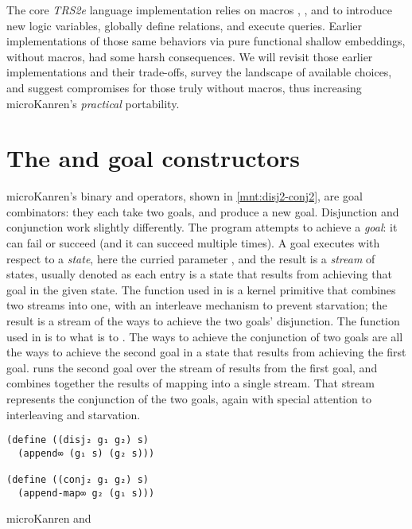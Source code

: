 \documentclass[sigplan,balance=true,pbalance=true,natbib=false]{acmart}
\begin{document}
The core \emph{TRS2e} language implementation relies on
macros , , and 
to introduce new logic variables, globally define relations, and
execute queries. Earlier implementations of those same behaviors via
pure functional shallow embeddings, without macros, had some harsh
consequences. We will revisit those earlier implementations and their
trade-offs, survey the landscape of available choices, and suggest
compromises for those truly without macros, thus increasing
microKanren's \emph{practical} portability.

\section{The  and  goal
  constructors}\label{sec:conde}

microKanren's binary  and 
operators, shown in \cref{mnt:disj2-conj2}, are goal combinators: they
each take two goals, and produce a new goal. Disjunction and
conjunction work slightly differently. The program attempts to achieve
a \emph{goal}: it can fail or succeed (and it can succeed multiple
times). A goal executes with respect to a \emph{state}, here the
curried parameter , and the result is a \emph{stream} of
states, usually denoted  as each entry is a state that
results from achieving that goal in the given state.
The
 function used in  is a kernel
primitive that combines two streams into one, with an interleave
mechanism to prevent starvation; the result is a stream of the ways to
achieve the two goals' disjunction. The 
function used in  is to
 what  is
to . The ways to achieve the conjunction of two
goals are all the ways to achieve the second goal in a state that
results from achieving the first goal.\@ {} runs
the second goal over the stream of results from the first goal, and
combines together the results of mapping into a single stream. That
stream represents the conjunction of the two goals, again with special
attention to interleaving and starvation.

\begin{listing}
  \begin{verbatim}
(define ((disj₂ g₁ g₂) s)
  (append∞ (g₁ s) (g₂ s)))

(define ((conj₂ g₁ g₂) s)
  (append-map∞ g₂ (g₁ s)))
  \end{verbatim}
  \caption{microKanren  and }\label{mnt:disj2-conj2}
\end{listing}
\end{document}
